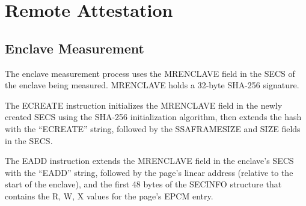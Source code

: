\section{Remote Attestation}
\label{sec:attestation}

\subsection{Enclave Measurement}
\label{sec:measurement}


The enclave measurement process uses the MRENCLAVE field in the SECS of the
enclave being measured. MRENCLAVE holds a 32-byte SHA-256 signature.


The ECREATE instruction initializes the MRENCLAVE field in the newly created
SECS using the SHA-256 initialization algorithm, then extends the hash with
the ``ECREATE'' string, followed by the SSAFRAMESIZE and SIZE fields in the
SECS.

\begin{table}[hbt]
  \caption{
    Data extended into MRENCLAVE by the ECREATE instruction.
  }
  \label{fig:ecreate_mrenclave}
\end{table}


The EADD instruction extends the MRENCLAVE field in the enclave's SECS with the
``EADD'' string, followed by the page's linear address (relative to the start
of the enclave), and the first 48 bytes of the SECINFO structure that contains
the R, W, X values for the page's EPCM entry.

\begin{table}[hbt]
  \caption{
    Data extended into MRENCLAVE by the EADD instruction.
  }
  \label{fig:eadd_mrenclave}
\end{table}

